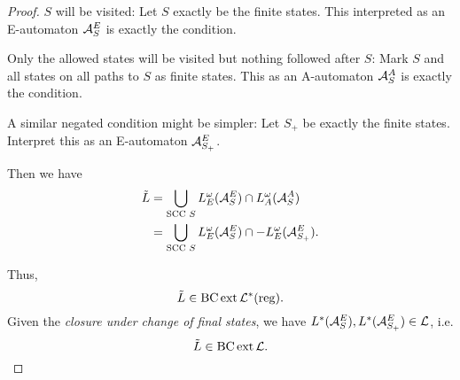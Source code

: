 \begin{theorem}
\begin{proof}
$S$ will be visited: Let $S$ exactly be the finite states. This interpreted as an E-automaton $\mathcal{A}^E_S$ is exactly the condition.

Only the allowed states will be visited but nothing followed after $S$: Mark $S$ and all states on all paths to $S$ as finite states. This as an A-automaton $\mathcal{A}^A_S$ is exactly the condition.

A similar negated condition might be simpler: Let $S_+$ be exactly the finite states. Interpret this as an E-automaton $\mathcal{A}^E_{S_+}$.

Then we have
\begin{align*}
\tilde L & = \bigcup_{\text{SCC } S} L^\omega_E (\mathcal{A}^E_S) \cap L^\omega_A (\mathcal{A}^A_S) \\
& = \bigcup_{\text{SCC } S} L^\omega_E (\mathcal{A}^E_S) \cap -L^\omega_E (\mathcal{A}^E_{S_+}) .
\end{align*}

Thus,
\[ \tilde L \in \operatorname{BC} \operatorname{ext} \mathcal{L}^*(\textup{\textrm{reg}}) . \]
Given the \emph{closure under change of final states}, we have $L^*(\mathcal{A}^E_S), L^*(\mathcal{A}^E_{S_+}) \in \mathcal{L}$, i.e.
\[ \tilde L \in \operatorname{BC} \operatorname{ext} \mathcal{L} . \]
\end{proof}
\end{theorem}

